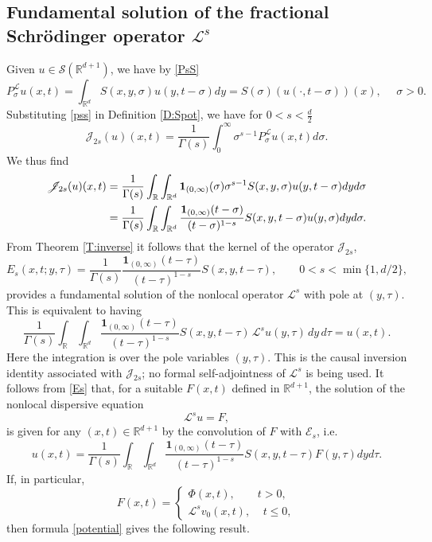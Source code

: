 \documentclass[11pt,letter]{amsart}
\def \RNu {\mathbb{R}^{d+1}}
\def \R {\mathbb{R}}
\def \G{\Gamma}
\newcommand{\Rd}{\mathbb R^d}
\numberwithin{equation}{section}
\newcommand{\Le}{\mathcal L}
\numberwithin{equation}{section}
\begin{document}
\subsection{Fundamental solution of the fractional Schr\"odinger operator $\Le^s$}\label{SS:fs}

Given $u\in \mathscr S(\R^{d+1})$, we have by \eqref{PsS} 
\begin{equation}\label{pss}
P^\Le_\sigma u(x,t)  = \int_{\Rd} S(x,y,\sigma) u(y,t-\sigma) dy = S(\sigma)(u(\cdot,t-\sigma))(x),\ \ \ \ \ \ \sigma>0.
\end{equation}
Substituting \eqref{pss} in Definition \ref{D:Spot}, we have for $0<s<\frac d2$ 
\[
\mathscr J_{2s}(u)(x,t) = \frac{1}{\G(s)} \int_0^\infty \sigma^{s -1} P^\Le_\sigma u(x,t) d\sigma.
\]
We thus find
\begin{align}\label{J2s}
\mathscr J_{2s}(u)(x,t) & = \frac{1}{\G(s)}  \int_\R \int_{\Rd} \mathbf 1_{(0,\infty)}(\sigma) \sigma^{s -1}  S(x,y,\sigma) u(y,t-\sigma) dy d\sigma  
\\
& = \frac{1}{\G(s)} \int_\R \int_{\Rd}  \frac{\mathbf 1_{(0,\infty)}(t-\sigma)}{(t-\sigma)^{1-s}}  S(x,y,t-\sigma) u(y,\sigma)  dy d\sigma. 
\notag
\end{align}
From Theorem \ref{T:inverse} it follows that the kernel 
of the operator $\mathscr J_{2s}$, 
\begin{equation}\label{Es}
E_s(x,t;y,\tau) =  \frac{1}{\G(s)} \frac{\mathbf 1_{(0,\infty)}(t-\tau)}{(t-\tau)^{1-s}}  S(x,y,t-\tau),\qquad 0<s<\min\{1,d/2\},
\end{equation}
provides a fundamental solution of the nonlocal operator $\Le^s$ with pole at $(y,\tau)$. This is equivalent to having
\begin{equation}\label{E:fundamental-inversion}
\frac{1}{\G(s)} \int_\R\int_{\Rd}
\frac{\mathbf 1_{(0,\infty)}(t-\tau)}{(t-\tau)^{1-s}}
S(x,y,t-\tau)\,\Le^s u(y,\tau)\,dy\,d\tau=u(x,t).
\end{equation}
Here the integration is over the pole variables $(y,\tau)$. This is the
causal inversion identity associated with $\mathscr J_{2s}$; no formal
self-adjointness of $\Le^s$ is being used.
It follows from \eqref{Es} that, for a suitable $F(x,t)$ defined in $\RNu$, the solution of the nonlocal dispersive equation
\begin{equation}\label{Lsu=F}
\Le^s u = F,
\end{equation}
is given for any $(x,t)\in \R^{d+1}$ by the convolution of $F$ with $\mathscr E_s$, i.e.
\begin{equation}\label{potential}
u(x,t) =  \frac{1}{\G(s)} \int_\R \int_{\Rd}  \frac{\mathbf 1_{(0,\infty)}(t-\tau)}{(t-\tau)^{1-s}}  S(x,y,t-\tau) F(y,\tau) dy d\tau.
\end{equation}
If, in particular, 
\begin{equation}\label{F}
F(x,t) = \begin{cases}
\Phi(x,t),\ \ \ \ \ \ \ \ \ t> 0,
\\
\Le^s v_0(x,t),\ \ \ \ \ t\le 0,
\end{cases}
\end{equation}
then formula \eqref{potential} gives the following result.
\end{document}
